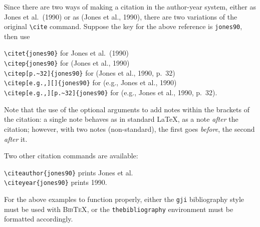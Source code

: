 \documentclass[extra,mreferee]{gji}
\newcommand{\btx}{\textsc{BibTeX}}
\begin{document}
Since there are two ways of making a citation in the author-year system,
either as Jones et al.\ (1990) or as (Jones et al., 1990), there
are two variations of the original \verb!\cite! command.
Suppose the key for the above reference is \texttt{jones90}, then use
\begin{flushleft}
\verb!\citet{jones90}! for Jones et al.\ (1990)\\
\verb!\citep{jones90}! for (Jones et al., 1990)\\
\verb!\citep[p.~32]{jones90}! for (Jones et al., 1990, p.~32)\\
\verb!\citep[e.g.,][]{jones90}! for (e.g., Jones et al., 1990)\\
\verb!\citep[e.g.,][p.~32]{jones90}! for (e.g., Jones et al., 1990, p.~32).

\end{flushleft}
Note that the use of the optional arguments to add notes within the
brackets of the citation:
a single note behaves as in standard \LaTeX, as a note
\emph{after} the citation; however, with two notes (non-standard), the
first goes \emph{before}, the second \emph{after} it.

Two other citation commands are available:
\begin{flushleft}
\verb!\citeauthor{jones90}! prints Jones et al.\\
\verb!\citeyear{jones90}! prints 1990.
\end{flushleft}

For the above examples to function properly, either the \verb"gji"
bibliography style must be used with \btx, or the
\texttt{thebibliography} environment must be formatted accordingly.

\begin{flushleft}
With \btx\\[1ex]
\verb!!\\
\verb!\verb!}!\\[1ex]
Without \btx\\[0.5ex]
\begin{verbatim}
\begin{thebibliography}{}
\bibitem[Jones et al.(1990)]{jones90}
  Jones, J. K., Thomas, P. R. 
  \& Peters, R. F., 1990.
  The best results of fitting curves. 
  \textit{J. Math. Dev.}, \textbf{12}, 1245--1261.
\end{thebibliography}
\end{verbatim}
\end{flushleft}
\end{document}
